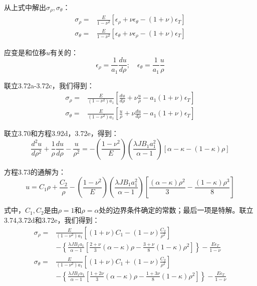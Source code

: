 从上式中解出$\sigma_\rho,\sigma_{\theta}$：
\begin{subequations}
	\begin{align}
\sigma_\rho=&\frac{E}{1-\nu^2}[\epsilon_\rho+\nu\epsilon_\theta-(1+\nu)\epsilon_T]\\
\sigma_\theta=&\frac{E}{1-\nu^2}[\epsilon_\theta+\nu\epsilon_\rho-(1+\nu)\epsilon_T]
	\end{align}
\end{subequations}

应变是和位移$u$有关的：
\begin{equation*}
\epsilon_\rho=\frac{1}{a_1}\frac{du}{d\rho};\quad \epsilon_\theta=\frac{1}{a_1}\frac{u}{\rho} \tag{3.72c}
\end{equation*}

联立3.72a-3.72c，我们得到：
\begin{align*}
\sigma_\rho=&\frac{E}{(1-\nu^2)a_1}[\frac{du}{d\rho}+\nu\frac{u}{\rho}-a_1(1+\nu)\epsilon_T]\tag{3.72d}\\ 
\sigma_\theta=&\frac{E}{(1-\nu^2)a_1}[\frac{u}{\rho}+\nu\frac{du}{d\rho}-a_1(1+\nu)\epsilon_T] \tag{3.72e}
\end{align*}

联立3.70和方程3.92d，3.72e，得到：
\begin{equation}
\frac{d^2u}{d\rho^2}+\frac{1}{\rho}\frac{du}{d\rho}-\frac{u}{\rho^2}=-(\frac{1-\nu^2}{E})(\frac{\lambda JB_1a_1^2}{\alpha-1})[\alpha-\kappa-(1-\kappa)\rho] %
\end{equation}

方程3.73的通解为：
\begin{equation}
u=C_1\rho+\frac{C_2}{\rho}-(\frac{1-\nu^2}{E})(\frac{\lambda JB_1a_1^2}{\alpha-1})[\frac{(\alpha-\kappa)\rho^2}{3}-\frac{(1-\kappa)\rho^3}{8}]%
\end{equation}

式中，$C_1,C_2$是由$\rho=1$和$\rho=\alpha$处的边界条件确定的常数；最后一项是特解。联立3.74,3.72d和3.72e，我们得到：
\begin{subequations}
	\begin{align}
\sigma_\rho=&\frac{E}{(1-\nu^2)a_1}\left[(1+\nu)C_1-(1-\nu)\frac{C_2}{\rho^2}\right] \\ \nonumber
&-\left\{\frac{\lambda JB_1a_1}{\alpha-1}[\frac{2+\nu}{3}(\alpha-\kappa)\rho-\frac{3+\nu}{8}(1-\kappa)\rho^2]\right\}-\frac{E\epsilon_T}{1-\nu}\\
\sigma_\theta=&\frac{E}{(1-\nu^2)a_1}\left[(1+\nu)C_1+(1-\nu)\frac{C_2}{\rho^2}\right]\\ \nonumber
&-\left\{\frac{\lambda JB_1\alpha_1}{\alpha-1}[\frac{1+2\nu}{3}(\alpha-\kappa)\rho-\frac{1+3\nu}{8}(1-\kappa)\rho^2]\right\}-\frac{E\epsilon_T}{1-\nu}
	\end{align}
\end{subequations}

